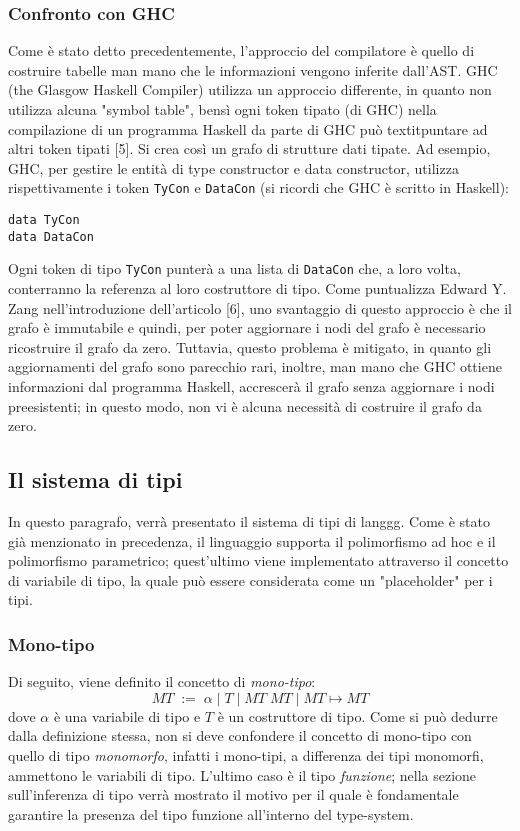 \documentclass[10pt,a4paper]{article}
\begin{document}
\subsubsection{Confronto con GHC}
Come è stato detto precedentemente, l'approccio del compilatore è quello di costruire tabelle man mano che le informazioni
vengono inferite dall'AST. GHC (the Glasgow Haskell Compiler) utilizza un approccio differente, in quanto non utilizza
alcuna "symbol table", bensì ogni token tipato (di GHC) nella compilazione di un programma Haskell da parte di GHC può
textit{puntare} ad altri token tipati [5]. Si crea così un grafo di strutture dati tipate. Ad esempio, GHC, per gestire
le entità di type constructor e data constructor, utilizza rispettivamente i token \texttt{TyCon} e \texttt{DataCon} (si
ricordi che GHC è scritto in Haskell):
\begin{lstlisting}
data TyCon
data DataCon
\end{lstlisting}
Ogni token di tipo \texttt{TyCon} punterà a una lista di \texttt{DataCon} che, a loro volta, conterranno la referenza
al loro costruttore di tipo. Come puntualizza Edward Y. Zang nell'introduzione dell'articolo [6],
uno svantaggio di questo approccio è che il grafo è immutabile e quindi, per poter
aggiornare i nodi del grafo è necessario ricostruire il grafo da zero. Tuttavia, questo problema è mitigato, in quanto
gli aggiornamenti del grafo sono parecchio rari, inoltre, man mano che GHC ottiene informazioni dal programma Haskell,
accrescerà il grafo senza aggiornare i nodi preesistenti; in questo modo, non vi è alcuna necessità di costruire il
grafo da zero.

\subsection{Il sistema di tipi}
In questo paragrafo, verrà presentato il sistema di tipi di langgg. Come è stato già menzionato in precedenza, il
linguaggio supporta il polimorfismo ad hoc e il polimorfismo parametrico; quest'ultimo viene implementato attraverso
il concetto di variabile di tipo, la quale può essere considerata come un "placeholder" per i tipi.

\subsubsection{Mono-tipo}
Di seguito, viene definito il concetto di \textit{mono-tipo}:
\[ MT \; := \; \alpha \; | \; T \; | \; MT \; MT \; | \; MT \mapsto MT \]
dove $ \alpha $ è una variabile di tipo e $ T $ è un costruttore di tipo. Come si può dedurre dalla definizione stessa,
non si deve confondere
il concetto di mono-tipo con quello di tipo \textit{monomorfo}, infatti i mono-tipi, a differenza dei tipi monomorfi,
ammettono le variabili di tipo. L'ultimo caso è il tipo \textit{funzione}; nella sezione sull'inferenza di tipo verrà
mostrato il motivo per il quale è fondamentale garantire la presenza del tipo funzione all'interno del type-system.
\end{document}
